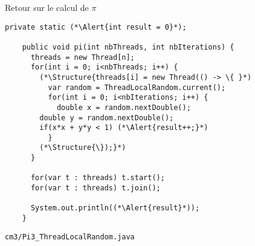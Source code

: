 
\begingroup

\begin{frame}[fragile]{Retour sur le calcul de $\pi$}
  \vfill

  \begin{lstlisting}[gobble=4]
    private static (*\Alert{int result = 0}*);

    public void pi(int nbThreads, int nbIterations) {
      threads = new Thread[n];
      for(int i = 0; i<nbThreads; i++) {
        (*\Structure{threads[i] = new Thread(() -> \{ }*)
          var random = ThreadLocalRandom.current();
          for(int i = 0; i<nbIterations; i++) {
            double x = random.nextDouble();
	    double y = random.nextDouble();
	    if(x*x + y*y < 1) (*\Alert{result++;}*)
          }
        (*\Structure{\});}*)
      }
      
      for(var t : threads) t.start();
      for(var t : threads) t.join();
      
      System.out.println((*\Alert{result}*));
    }
  \end{lstlisting}

  \vfill
  \begin{citing}
    \jitem \lstinline{cm3/Pi3_ThreadLocalRandom.java}
  \end{citing}
\end{frame}

\endgroup
\endinput

